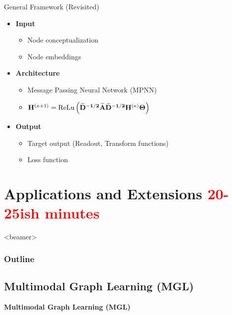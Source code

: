 \documentclass{beamer}
\newcommand{\OutlineRedux}
{
  \begin{frame}<beamer>
    \frametitle{Outline}
    \tableofcontents[currentsection]
  \end{frame}
}
\newcommand{\NodeRepMat}{\mathbf{H}}
\newcommand{\DegMat}{\mathbf{D}}
\newcommand{\iter}{\kappa}
\newcommand{\AdjMat}{\mathbf{A}}
\newcommand{\ReLu}{\text{ReLu}}
\begin{document}
\begin{frame}{General Framework (Revisited)}
    \begin{itemize}\setlength\itemsep{8mm}
        \item {\bf Input} 
            \begin{itemize}
                \item Node conceptualization
                \item Node embeddings
            \end{itemize}
        \item {\bf Architecture}
            \begin{itemize}
                \item Message Passing Neural Network (MPNN) 
                \item $\NodeRepMat^{(\iter+1)} 
                =
                \ReLu
                \left( 
                    \mathbf{
                    \widetilde{\DegMat}^{-1/2}
                    \widetilde{\AdjMat}
                    \widetilde{\DegMat}^{-1/2}  
                    \NodeRepMat^{(\iter)}
                    \Theta 
                    }            
                \right)$
            \end{itemize}
        \item {\bf Output}
            \begin{itemize}
                \item Target output (Readout, Transform functions)
                \item Loss function
            \end{itemize}
\end{itemize}
\end{frame}




\section{Applications and Extensions \textcolor{red}{20-25ish minutes}}
\OutlineRedux



\subsection{Multimodal Graph Learning (MGL)}

\begin{frame}{}
    \bf{\Large Multimodal Graph Learning (MGL)}    
\end{frame}
\end{document}
